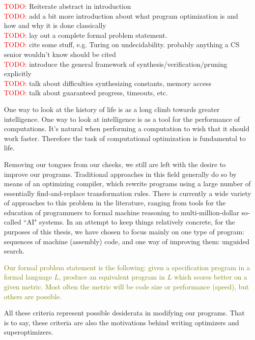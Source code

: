 \documentclass[12pt,twoside]{reedthesis}
\newcommand{\red}[1]{\textcolor{red}{#1}}
\newcommand{\green}[1]{\textcolor{olive}{#1}}
\begin{document}
        \red{TODO:} Reiterate abstract in introduction
     \\ \red{TODO:} add a bit more introduction about what program optimization is and how and why it is done classically
     \\ \red{TODO:} lay out a complete formal problem statement. 
     \\ \red{TODO:} cite some stuff, e.g. Turing on undecidability. probably anything a CS senior wouldn't know should be cited
     \\ \red{TODO:} introduce the general framework of synthesis/verification/pruning explicitly
     \\ \red{TODO:} talk about difficulties synthesizing constants, memory access
     \\ \red{TODO:} talk about guaranteed progress, timeouts, etc.
    
    One way to look at the history of life is as a long climb towards greater intelligence.
    One way to look at intelligence is as a tool for the performance of computations.
    It's natural when performing a computation to wish that it should work faster.
    Therefore the task of computational optimization is fundamental to life.

    Removing our tongues from our cheeks, we still are left with the desire to improve our programs. 
    Traditional approaches in this field generally do so by means of an optimizing compiler, which rewrite programs using a large number of essentially find-and-replace transformation rules.
    There is currently a wide variety of approaches to this problem in the literature, ranging from tools for the education of programmers to formal machine reasoning to multi-million-dollar so-called ``AI" systems.
    In an attempt to keep things relatively concrete, for the purposes of this thesis, we have chosen to focus mainly on one type of program: sequences of machine (assembly) code, and one way of improving them: unguided search.

    \green{
    Our formal problem statement is the following: given a specification program in a formal language $L$, produce an equivalent program in $L$ which scores better on a given metric.
    Most often the metric will be code size or performance (speed), but others are possible.
    }
    
    All these criteria represent possible desiderata in modifying our programs.
    That is to say, these criteria are also the motivations behind writing optimizers and superoptimizers. 
    
\end{document}
